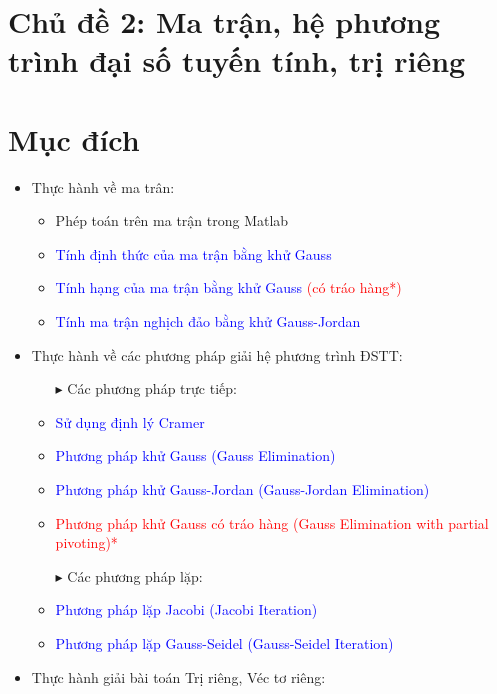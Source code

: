 \section*{Chủ đề 2: Ma trận, hệ phương trình đại số tuyến tính, trị riêng}

\section*{Mục đích}
\begin{itemize}
	\item Thực hành về ma trân:
	\begin{itemize}
	\item Phép toán trên ma trận trong Matlab
	\item \textcolor{blue}{Tính định thức của ma trận bằng khử Gauss}
	\item \textcolor{blue}{Tính hạng của ma trận bằng khử Gauss} \textcolor{red}{(có tráo hàng*)}
	\item \textcolor{blue}{Tính ma trận nghịch đảo bằng khử Gauss-Jordan}
	\end{itemize}
	\item Thực hành về các phương pháp giải hệ phương trình ĐSTT:
	\begin{itemize}[label={+}]
	\item[$\blacktriangleright$] Các phương pháp trực tiếp:
	\item \textcolor{blue}{Sử dụng định lý Cramer}
	\item \textcolor{blue}{Phương pháp khử Gauss (Gauss Elimination)}
	\item \textcolor{blue}{Phương pháp khử Gauss-Jordan (Gauss-Jordan Elimination)}
	\item \textcolor{red}{Phương pháp khử Gauss có tráo hàng (Gauss Elimination with partial pivoting)*}
	\item[$\blacktriangleright$] Các phương pháp lặp:
	\item \textcolor{blue}{Phương pháp lặp Jacobi (Jacobi Iteration)}
	\item \textcolor{blue}{Phương pháp lặp Gauss-Seidel (Gauss-Seidel Iteration)}
	\end{itemize}
	\item Thực hành giải bài toán Trị riêng, Véc tơ riêng:
	\begin{itemize}[label={+}]

\end{itemize}
\end{itemize}
